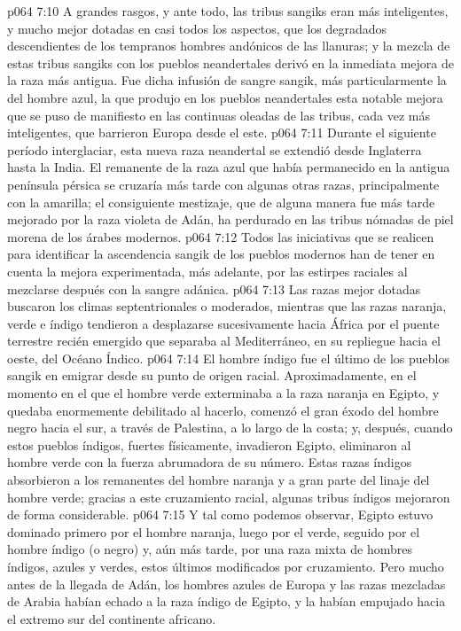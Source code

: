 \vs p064 7:10 A grandes rasgos, y ante todo, las tribus sangiks eran más inteligentes, y mucho mejor dotadas en casi todos los aspectos, que los degradados descendientes de los tempranos hombres andónicos de las llanuras; y la mezcla de estas tribus sangiks con los pueblos neandertales derivó en la inmediata mejora de la raza más antigua. Fue dicha infusión de sangre sangik, más particularmente la del hombre azul, la que produjo en los pueblos neandertales esta notable mejora que se puso de manifiesto en las continuas oleadas de las tribus, cada vez más inteligentes, que barrieron Europa desde el este.
\vs p064 7:11 Durante el siguiente período interglaciar, esta nueva raza neandertal se extendió desde Inglaterra hasta la India. El remanente de la raza azul que había permanecido en la antigua península pérsica se cruzaría más tarde con algunas otras razas, principalmente con la amarilla; el consiguiente mestizaje, que de alguna manera fue más tarde mejorado por la raza violeta de Adán, ha perdurado en las tribus nómadas de piel morena de los árabes modernos.
\vs p064 7:12 \pc Todos las iniciativas que se realicen para identificar la ascendencia sangik de los pueblos modernos han de tener en cuenta la mejora experimentada, más adelante, por las estirpes raciales al mezclarse después con la sangre adánica.
\vs p064 7:13 \pc Las razas mejor dotadas buscaron los climas septentrionales o moderados, mientras que las razas naranja, verde e índigo tendieron a desplazarse sucesivamente hacia África por el puente terrestre recién emergido que separaba al Mediterráneo, en su repliegue hacia el oeste, del Océano Índico.
\vs p064 7:14 El hombre índigo fue el último de los pueblos sangik en emigrar desde su punto de origen racial. Aproximadamente, en el momento en el que el hombre verde exterminaba a la raza naranja en Egipto, y quedaba enormemente debilitado al hacerlo, comenzó el gran éxodo del hombre negro hacia el sur, a través de Palestina, a lo largo de la costa; y, después, cuando estos pueblos índigos, fuertes físicamente, invadieron Egipto, eliminaron al hombre verde con la fuerza abrumadora de su número. Estas razas índigos absorbieron a los remanentes del hombre naranja y a gran parte del linaje del hombre verde; gracias a este cruzamiento racial, algunas tribus índigos mejoraron de forma considerable.
\vs p064 7:15 Y tal como podemos observar, Egipto estuvo dominado primero por el hombre naranja, luego por el verde, seguido por el hombre índigo (o negro) y, aún más tarde, por una raza mixta de hombres índigos, azules y verdes, estos últimos modificados por cruzamiento. Pero mucho antes de la llegada de Adán, los hombres azules de Europa y las razas mezcladas de Arabia habían echado a la raza índigo de Egipto, y la habían empujado hacia el extremo sur del continente africano.
